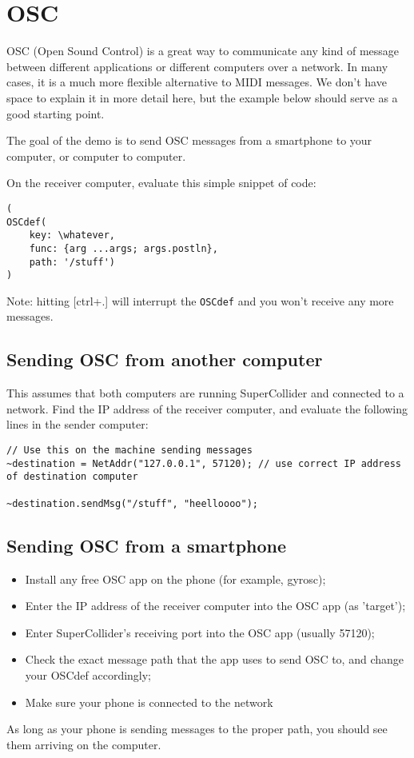 \section{OSC}

OSC (Open Sound Control) is a great way to communicate any kind of message between different applications or different computers over a network. In many cases, it is a much more flexible alternative to MIDI messages. We don't have space to explain it in more detail here, but the example below should serve as a good starting point.

The goal of the demo is to send OSC messages from a smartphone to your computer, or computer to computer.

On the receiver computer, evaluate this simple snippet of code:

\bigskip
\begin{lstlisting}[style=SuperCollider-IDE, basicstyle=\scttfamily\footnotesize]
(
OSCdef(
	key: \whatever,
	func: {arg ...args; args.postln},
	path: '/stuff')
)
\end{lstlisting}

Note: hitting [ctrl+.] will interrupt the \texttt{OSCdef} and you won't receive any more messages.

\subsection{Sending OSC from another computer}

This assumes that both computers are running SuperCollider and connected to a network. Find the IP address of the receiver computer, and evaluate the following lines in the sender computer:

\begin{lstlisting}[style=SuperCollider-IDE, basicstyle=\scttfamily\footnotesize]
// Use this on the machine sending messages
~destination = NetAddr("127.0.0.1", 57120); // use correct IP address of destination computer

~destination.sendMsg("/stuff", "heelloooo");
\end{lstlisting}


\subsection{Sending OSC from a smartphone}

\begin{itemize}
\item Install any free OSC app on the phone (for example, gyrosc);
\item Enter the IP address of the receiver computer into the OSC app (as 'target');
\item Enter SuperCollider's receiving port into the OSC app (usually 57120);
\item Check the exact message path that the app uses to send OSC to, and change your OSCdef accordingly;
\item Make sure your phone is connected to the network
\end{itemize}

As long as your phone is sending messages to the proper path, you should see them arriving on the computer.